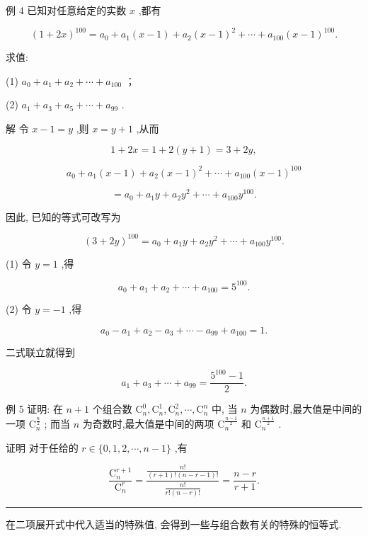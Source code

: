 \documentclass[10pt]{article}
\newcommand{\HRule}{\begin{center}\rule{0.9\linewidth}{0.2mm}\end{center}}
\begin{document}
例 4 已知对任意给定的实数 \(x\) ,都有

\[
{\left( 1 + 2x\right) }^{100} = {a}_{0} + {a}_{1}\left( {x - 1}\right)  + {a}_{2}{\left( x - 1\right) }^{2} + \cdots  + {a}_{100}{\left( x - 1\right) }^{100}.
\]

求值:

(1) \({a}_{0} + {a}_{1} + {a}_{2} + \cdots  + {a}_{100}\) ；

(2) \({a}_{1} + {a}_{3} + {a}_{5} + \cdots  + {a}_{99}\) .

解 令 \(x - 1 = y\) ,则 \(x = y + 1\) ,从而

\[
1 + {2x} = 1 + 2\left( {y + 1}\right)  = 3 + {2y},
\]

\[
{a}_{0} + {a}_{1}\left( {x - 1}\right)  + {a}_{2}{\left( x - 1\right) }^{2} + \cdots  + {a}_{100}{\left( x - 1\right) }^{100}
\]

\[
= {a}_{0} + {a}_{1}y + {a}_{2}{y}^{2} + \cdots  + {a}_{100}{y}^{100}.
\]

因此, 已知的等式可改写为

\[
{\left( 3 + 2y\right) }^{100} = {a}_{0} + {a}_{1}y + {a}_{2}{y}^{2} + \cdots  + {a}_{100}{y}^{100}.
\]

(1) 令 \(y = 1\) ,得

\[
{a}_{0} + {a}_{1} + {a}_{2} + \cdots  + {a}_{100} = {5}^{100}.
\]

(2) 令 \(y =  - 1\) ,得

\[
{a}_{0} - {a}_{1} + {a}_{2} - {a}_{3} + \cdots  - {a}_{99} + {a}_{100} = 1.
\]

二式联立就得到

\[
{a}_{1} + {a}_{3} + \cdots  + {a}_{99} = \frac{{5}^{100} - 1}{2}.
\]

例 5 证明: 在 \(n + 1\) 个组合数 \({\mathrm{C}}_{n}^{0},{\mathrm{C}}_{n}^{1},{\mathrm{C}}_{n}^{2},\cdots ,{\mathrm{C}}_{n}^{n}\) 中, 当 \(n\) 为偶数时,最大值是中间的一项 \({\mathrm{C}}_{n}^{\frac{n}{2}}\) ; 而当 \(n\) 为奇数时,最大值是中间的两项 \({\mathrm{C}}_{n}^{\frac{n - 1}{2}}\) 和 \({\mathrm{C}}_{n}^{\frac{n + 1}{2}}\) .

证明 对于任给的 \(r \in  \{ 0,1,2,\cdots ,n - 1\}\) ,有



\[
\frac{{\mathrm{C}}_{n}^{r + 1}}{{\mathrm{C}}_{n}^{r}} = \frac{\frac{n!}{\left( {r + 1}\right) !\left( {n - r - 1}\right) !}}{\frac{n!}{r!\left( {n - r}\right) !}} = \frac{n - r}{r + 1}.
\]

\HRule

在二项展开式中代入适当的特殊值, 会得到一些与组合数有关的特殊的恒等式.
\end{document}
